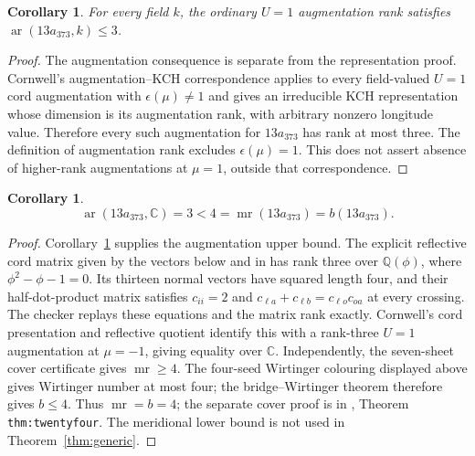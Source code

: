 \documentclass[11pt]{article}
\newtheorem{corollary}[theorem]{Corollary}
\begin{document}
\begin{corollary}\label{cor:augmentation}
For every field $k$, the ordinary $U=1$ augmentation rank satisfies
$\operatorname{ar}(13a_{373},k)\le3$.
\end{corollary}
\begin{proof}
The augmentation consequence is separate from the representation proof.
Cornwell's augmentation--KCH correspondence
\cite[Theorem1.2 and Definition1.8]{cornwell17} applies
to every field-valued $U=1$ cord augmentation with
$\epsilon(\mu)\ne1$ and gives an irreducible KCH representation whose
dimension is its augmentation rank, with arbitrary nonzero longitude
value. Therefore every such augmentation for $13a_{373}$ has rank at
most three. The definition of augmentation rank excludes $\epsilon(\mu)=1$.
This does not assert absence of higher-rank augmentations at $\mu=1$,
outside that correspondence.
\end{proof}

\begin{corollary}\label{cor:gap}
\[
 \operatorname{ar}(13a_{373},\mathbb C)=3
 <4=\operatorname{mr}(13a_{373})=b(13a_{373}).
\]
\end{corollary}
\begin{proof}
Corollary~\ref{cor:augmentation} supplies the augmentation upper bound.
The explicit reflective cord matrix given by the vectors below and in
 has rank three over
$\mathbb Q(\phi)$, where $\phi^2-\phi-1=0$. Its thirteen normal vectors
have squared length four, and their half-dot-product matrix satisfies
$c_{ii}=2$ and $c_{\ell a}+c_{\ell b}=c_{\ell o}c_{oa}$ at every crossing.
The checker replays these equations and the matrix rank exactly.
Cornwell's cord presentation and reflective quotient
\cite[Section3]{cornwell15} identify this with a rank-three $U=1$
augmentation at $\mu=-1$, giving equality over $\mathbb C$.
Independently, the seven-sheet cover certificate gives
$\operatorname{mr}\ge4$. The four-seed Wirtinger colouring displayed
above gives Wirtinger number at most four; the bridge--Wirtinger
theorem \cite[Theorem1.3]{wirt} therefore gives $b\le4$.
Thus $\operatorname{mr}=b=4$; the separate cover proof is in
,
Theorem \texttt{thm:twentyfour}.
The meridional lower bound is not used in Theorem~\ref{thm:generic}.
\end{proof}
\end{document}
